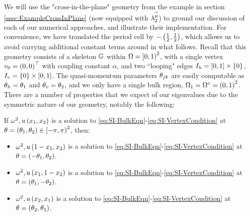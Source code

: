 We will use the "cross-in-the-plane" geometry from the example in section \ref{ssec:ExampleCrossInPlane} (now equipped with $\lambda_2^{\widetilde{\mu}}$) to ground our discussion of each of our numerical approaches, and illustrate their implementation.
For convenience, we have translated the period cell by $-\left( \frac{1}{2},\frac{1}{2} \right)$, which allows us to avoid carrying additional constant terms around in what follows.
Recall that this geometry consists of a skeleton $\mathbb{G}$ within $\Omega=\left[0,1\right)^2$, with a single vertex $v_0=\left( 0,0 \right)^\top$ with coupling constant $\alpha$, and two ``looping" edges $I_h = \left[ 0,1 \right]\times\left\{ 0 \right\}$, $I_v=\left\{ 0 \right\}\times\left[ 0,1 \right]$.
The quasi-momentum parameters $\theta_{jk}$ are easily computable as $\theta_h = \theta_1$ and $\theta_v = \theta_2$, and we only have a single bulk region, $\Omega_1 = \Omega^{\circ}=\left( 0,1 \right)^2$.
There are a number of properties that we expect of our eigenvalues due to the symmetric nature of our geometry, notably the following:
\begin{prop} \label{prop:CrossInPlaneSymmetries}
	If $\omega^2, u\left( x_1,x_2 \right)$ is a solution to \eqref{eq:SI-BulkEqn}-\eqref{eq:SI-VertexCondition} at $\theta = \left( \theta_1,\theta_2 \right)\in\left[-\pi,\pi\right)^2$, then:
	\begin{itemize}
		\item $\omega^2, u\left( 1-x_1,x_2 \right)$ is a solution to \eqref{eq:SI-BulkEqn}-\eqref{eq:SI-VertexCondition} at $\theta = \left( -\theta_1, \theta_2 \right)$.
		\item $\omega^2, u\left( x_1,1-x_2 \right)$ is a solution to \eqref{eq:SI-BulkEqn}-\eqref{eq:SI-VertexCondition} at $\theta = \left( \theta_1, -\theta_2 \right)$.
		\item $\omega^2, u\left( x_2,x_1 \right)$ is a solution to \eqref{eq:SI-BulkEqn}-\eqref{eq:SI-VertexCondition} at $\theta = \left( \theta_2, \theta_1 \right)$.
	\end{itemize}
\end{prop}

